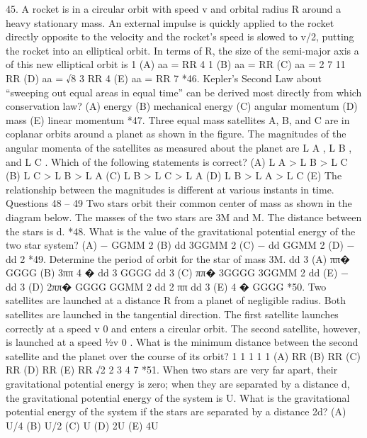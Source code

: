 45. A rocket is in a circular orbit with speed v and orbital radius R around a heavy stationary mass. An external
impulse is quickly applied to the rocket directly opposite to the velocity and the rocket’s speed is slowed to v/2,
putting the rocket into an elliptical orbit. In terms of R, the size of the semi-major axis a of this new elliptical
orbit is
1
(A) aa = RR
4
1
(B) aa = RR
(C) aa =
2
7
11
RR
(D) aa =
√8
3
RR
4
(E) aa = RR
7
*46. Kepler’s Second Law about “sweeping out equal areas in equal time” can be derived most directly from which
conservation law?
(A) energy (B) mechanical energy (C) angular momentum (D) mass (E) linear momentum
*47. Three equal mass satellites A, B, and C are in coplanar orbits around a planet as shown in the figure. The
magnitudes of the angular momenta of the satellites as measured about the planet are L A , L B , and L C . Which of
the following statements is correct?
(A) L A > L B > L C (B) L C > L B > L A (C) L B > L C > L A (D) L B > L A > L C
(E) The relationship between the magnitudes is different at various instants in time.
Questions 48 – 49
Two stars orbit their common center of mass as shown in the diagram below. The masses of the two stars are
3M and M. The distance between the stars is d.
*48. What is the value of the gravitational potential energy of the two star system?
(A) −
GGMM 2
(B)
dd
3GGMM 2
(C) −
dd
GGMM 2
(D) −
dd 2
*49. Determine the period of orbit for the star of mass 3M.
dd 3
(A) ππ� GGGG
(B)
3ππ
4
�
dd 3
GGGG
dd 3
(C) ππ� 3GGGG
3GGMM 2
dd
(E) −
dd 3
(D) 2ππ� GGGG
GGMM 2
dd 2
ππ
dd 3
(E) 4 � GGGG
*50. Two satellites are launched at a distance R from a planet of negligible radius. Both satellites are launched in the
tangential direction. The first satellite launches correctly at a speed v 0 and enters a circular orbit. The second
satellite, however, is launched at a speed 1⁄2v 0 . What is the minimum distance between the second satellite and
the planet over the course of its orbit?
1
1
1
1
1
(A) RR (B) RR (C) RR (D) RR (E) RR
√2
2
3
4
7
*51. When two stars are very far apart, their gravitational potential energy is zero; when they are separated by a
distance d, the gravitational potential energy of the system is U. What is the gravitational potential energy of the
system if the stars are separated by a distance 2d?
(A) U/4
(B) U/2 (C) U (D) 2U (E) 4U



